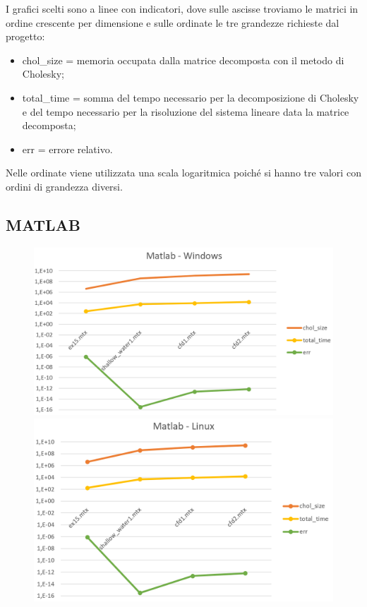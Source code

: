 \documentclass[a4paper,10pt]{article}
\begin{document}
I grafici scelti sono a linee con indicatori, dove sulle ascisse troviamo le matrici in ordine crescente per dimensione e sulle ordinate le tre grandezze richieste dal progetto:
\begin{itemize}
\item chol\_size = memoria occupata dalla matrice decomposta con il metodo di Cholesky;
\item total\_time = somma del tempo necessario per la decomposizione di Cholesky e del tempo necessario per la risoluzione del sistema lineare data la matrice decomposta;
\item err = errore relativo.
\end{itemize}
Nelle ordinate viene utilizzata una scala logaritmica poiché si hanno tre valori con ordini di grandezza diversi.
 

\subsection{MATLAB}


\begin{figure}[H]
\centering
\begin{minipage}{.5\textwidth}
  \centering
  \includegraphics[width=1\linewidth]{img/matlabwin.png}
\end{minipage}%
\begin{minipage}{.5\textwidth}
  \centering
  \includegraphics[width=1\linewidth]{img/matlablinux.png}
\end{minipage}
\end{figure}
\end{document}
